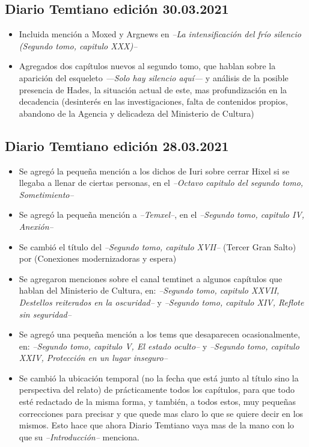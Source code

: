\documentclass[
  spanish,
]{book}
\begin{document}
\hypertarget{diario-temtiano-ediciuxf3n-30.03.2021}{%
\subsection*{Diario Temtiano edición 30.03.2021}\label{diario-temtiano-ediciuxf3n-30.03.2021}}

\begin{itemize}
\item[$\boxtimes$]
  Incluida mención a Moxed y Argnews en \emph{--La intensificación del frío silencio (Segundo tomo, capitulo XXX)--}
\item[$\boxtimes$]
  Agregados dos capítulos nuevos al segundo tomo, que hablan sobre la aparición del esqueleto \emph{---Solo hay silencio aquí---} y análisis de la posible presencia de Hades, la situación actual de este, mas profundización en la decadencia (desinterés en las investigaciones, falta de contenidos propios, abandono de la Agencia y delicadeza del Ministerio de Cultura)
\end{itemize}

\hypertarget{diario-temtiano-ediciuxf3n-28.03.2021}{%
\subsection*{Diario Temtiano edición 28.03.2021}\label{diario-temtiano-ediciuxf3n-28.03.2021}}

\begin{itemize}
\item[$\boxtimes$]
  Se agregó la pequeña mención a los dichos de Iuri sobre cerrar Hixel si se llegaba a llenar de ciertas personas, en el \emph{--Octavo capitulo del segundo tomo, Sometimiento--}
\item[$\boxtimes$]
  Se agregó la pequeña mención a \emph{--Temxel--}, en el \emph{--Segundo tomo, capitulo IV, Anexión--}
\item[$\boxtimes$]
  Se cambió el título del \emph{--Segundo tomo, capitulo XVII--} (Tercer Gran Salto) por (Conexiones modernizadoras y espera)
\item[$\boxtimes$]
  Se agregaron menciones sobre el canal temtinet a algunos capítulos que hablan del Ministerio de Cultura, en: \emph{--Segundo tomo, capitulo XXVII, Destellos reiterados en la oscuridad--} y \emph{--Segundo tomo, capitulo XIV, Reflote sin seguridad--}
\item[$\boxtimes$]
  Se agregó una pequeña mención a los tems que desaparecen ocasionalmente, en: \emph{--Segundo tomo, capitulo V, El estado oculto--} y \emph{--Segundo tomo, capitulo XXIV, Protección en un lugar inseguro--}
\item[$\boxtimes$]
  Se cambió la ubicación temporal (no la fecha que está junto al título sino la perspectiva del relato) de prácticamente todos los capítulos, para que todo esté redactado de la misma forma, y también, a todos estos, muy pequeñas correcciones para precisar y que quede mas claro lo que se quiere decir en los mismos. Esto hace que ahora Diario Temtiano vaya mas de la mano con lo que su \emph{--Introducción--} menciona.
\end{itemize}
\end{document}
